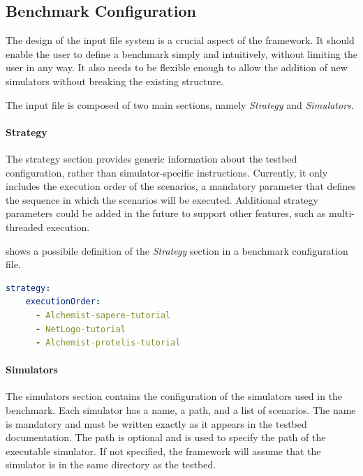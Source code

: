 \documentclass[12pt,a4paper,openright,twoside]{book}
\begin{document}
\subsection{Benchmark Configuration}

The design of the input file system is a crucial aspect of the framework.
It should enable the user to define a benchmark simply and intuitively, without limiting the user in any way.
It also needs to be flexible enough to allow the addition of new simulators without breaking the existing structure.

The input file is composed of two main sections, namely \emph{Strategy} and \emph{Simulators}.

\paragraph*{Strategy}
The strategy section provides generic information about the testbed configuration, rather than simulator-specific instructions.
Currently, it only includes the execution order of the scenarios, a mandatory parameter that defines the sequence in which the scenarios will be executed.
Additional strategy parameters could be added in the future to support other features, such as multi-threaded execution.

 shows a possibile definition of the \emph{Strategy} section in a benchmark configuration file.

\begin{lstlisting}[language=yaml, label={lst:benchmark-configuration-strategy}, caption={Benchmark configuration file structure: Strategy section.}]
  strategy:
    executionOrder:
      - Alchemist-sapere-tutorial
      - NetLogo-tutorial
      - Alchemist-protelis-tutorial
\end{lstlisting}

\paragraph*{Simulators}
The simulators section contains the configuration of the simulators used in the benchmark.
Each simulator has a name, a path, and a list of scenarios.
The name is mandatory and must be written exactly as it appears in the testbed documentation.
The path is optional and is used to specify the path of the executable simulator.
If not specified, the framework will assume that the simulator is in the same directory as the testbed.
\end{document}
